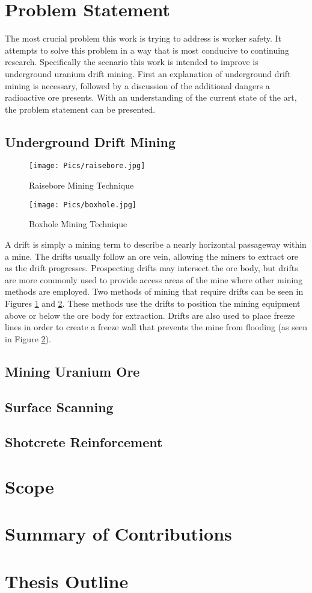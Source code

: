 \section{Problem Statement}
\label{sec:prob}
The most crucial problem this work is trying to address is worker safety. It attempts to solve this problem in a way that is most conducive to continuing research. Specifically the scenario this work is intended to improve is underground uranium drift mining. First an explanation of underground drift mining is necessary, followed by a discussion of the additional dangers a radioactive ore presents. With an understanding of the current state of the art, the problem statement can be presented.\\

\subsection{Underground Drift Mining}

\begin{figure}
    \centering
    \texttt{[image: Pics/raisebore.jpg]}
    \caption{Raisebore Mining Technique \cite{weblink}}
    \label{fig:raisebore}
\end{figure}
\begin{figure}
    \centering
    \texttt{[image: Pics/boxhole.jpg]}
    \caption{Boxhole Mining Technique \cite{weblink}}
    \label{fig:boxhole}
\end{figure}
A drift is simply a mining term to describe a nearly horizontal passageway within a mine. The drifts usually follow an ore vein, allowing the miners to extract ore as the drift progresses. Prospecting drifts may intersect the ore body, but drifts are more commonly used to provide access areas of the mine where other mining methods are employed. Two methods of mining that require drifts can be seen in Figures \ref{fig:raisebore} and \ref{fig:boxhole}. These methods use the drifts to position the mining equipment above or below the ore body for extraction. Drifts are also used to place freeze lines in order to create a freeze wall that prevents the mine from flooding (as seen in Figure \ref{fig:boxhole}).\\


\subsection{Mining Uranium Ore}
\subsection{Surface Scanning}
\subsection{Shotcrete Reinforcement}
\section{Scope}
\label{sec:scope}
\section{Summary of Contributions}
\label{sec:contributions}
\section{Thesis Outline}
\label{sec:outline}